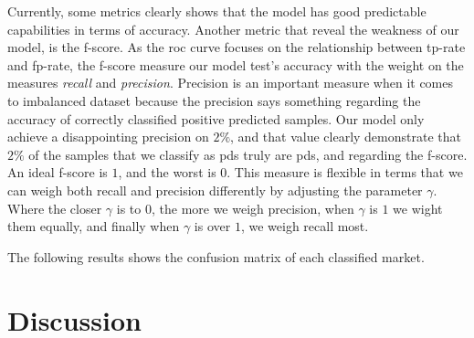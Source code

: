 Currently, some metrics clearly shows that the model has good predictable capabilities in terms of accuracy. Another metric that reveal  the weakness of our model, is the f-score. As the \ac{roc} curve focuses on the relationship between tp-rate and fp-rate, the f-score measure our model test's accuracy with the weight on the measures \emph{recall} and \emph{precision}. Precision is an important measure when it comes to imbalanced dataset because the precision says something regarding the accuracy of correctly classified positive predicted samples. Our model only achieve a disappointing precision on $2\%$, and that value clearly demonstrate that $2\%$ of the samples that we classify as \acp{pd} truly are \acp{pd}, and regarding the f-score. An ideal f-score is $1$, and the worst is $0$. This measure is flexible in terms that we can weigh both recall and precision differently by adjusting the parameter $\gamma$. Where the closer $\gamma$ is to $0$, the more we weigh precision, when $\gamma$ is $1$ we wight them equally, and finally when $\gamma$ is over $1$, we weigh recall most.


The following results shows the confusion matrix of each classified market.


\section{Discussion}